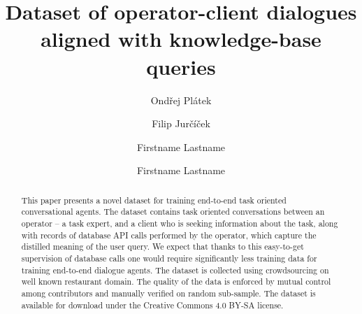 \documentclass[runningheads,a4paper]{llncs}
\def\OP#1{#1}  %
\begin{document}


\title{Dataset of operator-client dialogues aligned with knowledge-base queries}

\author{Ondřej Plátek \and Filip Jurčíček}

\iftrue %
\author{Firstname Lastname \and Firstname Lastname }
\fi
			
\maketitle

\begin{abstract}
    This paper presents a novel dataset for training end-to-end task oriented conversational agents.
    The dataset contains task oriented conversations between an operator – a task expert, and a client who is seeking information about the task, along with records of database API calls performed by the operator, which capture the distilled meaning of the user query.
    We expect that thanks to this easy-to-get supervision of database calls one would require significantly less training data for training end-to-end dialogue agents.
 	The dataset is collected using crowdsourcing on well known restaurant domain.
    The quality of the data is enforced by mutual control among contributors and manually verified on random sub-sample.
    The dataset is available for download under the Creative Commons 4.0 BY-SA license.
\end{abstract}

\vspace{-1.00em}
\vspace{-1.00em}
\end{document}
